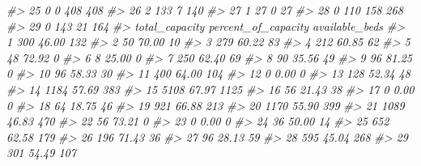\documentclass[
]{krantz}
\makeatletter
\newenvironment{Shaded}{\begin{snugshade}}{\end{snugshade}}
\newcommand{\CommentTok}[1]{\textcolor[rgb]{0.37,0.37,0.37}{\textit{#1}}}
\newenvironment{kframe}{%
\medskip{}
\setlength{\fboxsep}{.8em}
 \def\at@end@of@kframe{}%
 \ifinner\ifhmode%
  \def\at@end@of@kframe{\end{minipage}}%
  \begin{minipage}{\columnwidth}%
 \fi\fi%
 \def\FrameCommand##1{\hskip\@totalleftmargin \hskip-\fboxsep
 \colorbox{shadecolor}{##1}\hskip-\fboxsep
     \hskip-\linewidth \hskip-\@totalleftmargin \hskip\columnwidth}%
 \MakeFramed {\advance\hsize-\width
   \@totalleftmargin\z@ \linewidth\hsize
   \@setminipage}}%
 {\par\unskip\endMakeFramed%
 \at@end@of@kframe}
\renewenvironment{Shaded}{\begin{kframe}}{\end{kframe}}
\makeatother
\begin{document}
\begin{Shaded}
\begin{Highlighting}[]
\CommentTok{\#\textgreater{} 25            0           0            408              408}
\CommentTok{\#\textgreater{} 26            2         133              7              140}
\CommentTok{\#\textgreater{} 27            1          27              0               27}
\CommentTok{\#\textgreater{} 28            0         110            158              268}
\CommentTok{\#\textgreater{} 29            0         143             21              164}
\CommentTok{\#\textgreater{}    total\_capacity percent\_of\_capacity available\_beds}
\CommentTok{\#\textgreater{} 1             300               46.00            132}
\CommentTok{\#\textgreater{} 2              50               70.00             10}
\CommentTok{\#\textgreater{} 3             279               60.22             83}
\CommentTok{\#\textgreater{} 4             212               60.85             62}
\CommentTok{\#\textgreater{} 5              48               72.92              0}
\CommentTok{\#\textgreater{} 6               8               25.00              0}
\CommentTok{\#\textgreater{} 7             250               62.40             69}
\CommentTok{\#\textgreater{} 8              90               35.56             49}
\CommentTok{\#\textgreater{} 9              96               81.25              0}
\CommentTok{\#\textgreater{} 10             96               58.33             30}
\CommentTok{\#\textgreater{} 11            400               64.00            104}
\CommentTok{\#\textgreater{} 12              0                0.00              0}
\CommentTok{\#\textgreater{} 13            128               52.34             48}
\CommentTok{\#\textgreater{} 14           1184               57.69            383}
\CommentTok{\#\textgreater{} 15           5108               67.97           1125}
\CommentTok{\#\textgreater{} 16             56               21.43             38}
\CommentTok{\#\textgreater{} 17              0                0.00              0}
\CommentTok{\#\textgreater{} 18             64               18.75             46}
\CommentTok{\#\textgreater{} 19            921               66.88            213}
\CommentTok{\#\textgreater{} 20           1170               55.90            399}
\CommentTok{\#\textgreater{} 21           1089               46.83            470}
\CommentTok{\#\textgreater{} 22             56               73.21              0}
\CommentTok{\#\textgreater{} 23              0                0.00              0}
\CommentTok{\#\textgreater{} 24             36               50.00             14}
\CommentTok{\#\textgreater{} 25            652               62.58            179}
\CommentTok{\#\textgreater{} 26            196               71.43             36}
\CommentTok{\#\textgreater{} 27             96               28.13             59}
\CommentTok{\#\textgreater{} 28            595               45.04            268}
\CommentTok{\#\textgreater{} 29            301               54.49            107}
\end{Highlighting}
\end{Shaded}
\end{document}
